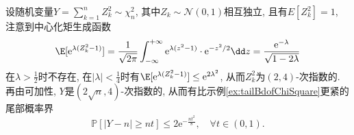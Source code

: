 \begin{example}
	设随机变量$Y = \sum_{k=1}^n Z_k^2  \sim \chi^2_n$,  其中$Z_k \sim \mathcal{N}(0,1)$相互独立, 且有$E[Z_k^2] = 1$, 注意到中心化矩生成函数
	\begin{equation*}
		\E[\mathrm{e}^{\lambda(Z_k^2 - 1)}]
		= \frac{1}{\sqrt{2 \pi}} \int_{-\infty}^{+\infty} \mathrm{e}^{\lambda(z^2-1)} \cdot \mathrm{e}^{-z^2/2} \dd z
		= \frac{\mathrm{e}^{-\lambda}}{\sqrt{1-2\lambda}}
	\end{equation*}
	在$\lambda > \frac{1}{2}$时不存在, 在$|\lambda| < \frac{1}{4}$时有$\E[\mathrm{e}^{\lambda(Z_k^2 - 1)}] \leq \mathrm{e}^{2 \lambda^2}$, 从而$Z_k^2$为$(2,4)$-次指数的. 
	再由可加性, $Y$是$(2 \sqrt{n}, 4)$-次指数的, 从而有比示例\ref{ex:tailBdofChiSquare}更紧的尾部概率界
	\begin{equation}\label{eq:tailOfChiSq}
		\mathbb{P} \left[ \left| Y - n \right| \geq n t \right]
		\leq 2 \mathrm{e}^{- \frac{n t^2}{8}},\quad \forall t \in (0,1). 
	\end{equation}
\end{example}


